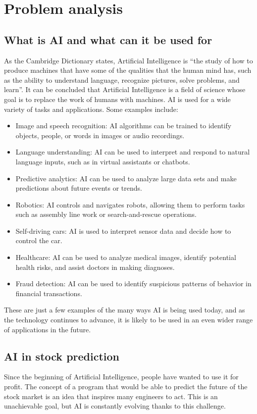 \chapter{Problem analysis}

\section{What is AI and what can it be used for}
As the Cambridge Dictionary states, Artificial Intelligence is “the study of how to produce machines that have some of the qualities that the human mind has, such as the ability to understand language, recognize pictures, solve problems, and learn”\cite{bib:cambridge}. It can be concluded that Artificial Intelligence is a field of science whose goal is to replace the work of humans with machines.
AI is used for a wide variety of tasks and applications. Some examples include:
\begin{itemize}
    \item Image and speech recognition: AI algorithms can be trained to identify objects, people, or words in images or audio recordings.
    \item Language understanding: AI can be used to interpret and respond to natural language inputs, such as in virtual assistants or chatbots.
    \item Predictive analytics: AI can be used to analyze large data sets and make predictions about future events or trends.
    \item Robotics: AI controls and navigates robots, allowing them to perform tasks such as assembly line work or search-and-rescue operations.
    \item Self-driving cars: AI is used to interpret sensor data and decide how to control the car.
    \item Healthcare: AI can be used to analyze medical images, identify potential health risks, and assist doctors in making diagnoses.
    \item Fraud detection: AI can be used to identify suspicious patterns of behavior in financial transactions.
\end{itemize} 
These are just a few examples of the many ways AI is being used today, and as the technology continues to advance, it is likely to be used in an even wider range of applications in the future.

\section{AI in stock prediction}
Since the beginning of Artificial Intelligence, people have wanted to use it for profit. The concept of a program that would be able to predict the future of the stock market is an idea that inspires many engineers to act. This is an unachievable goal, but AI is constantly evolving thanks to this challenge.

